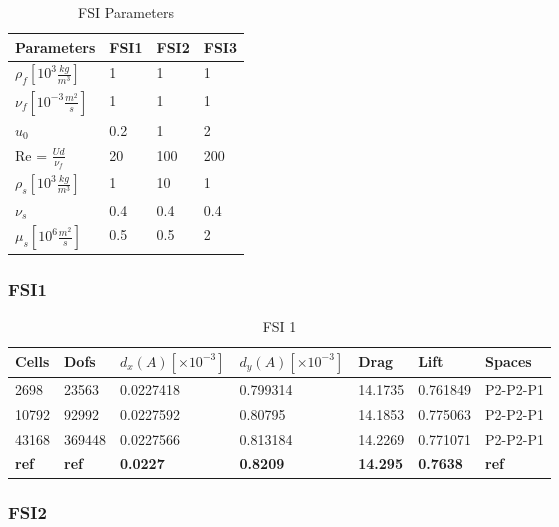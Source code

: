 \begin{table}[h!]
\centering
\caption{FSI Parameters}
\label{my-label}
\begin{tabular}{|l|l|l|l|}
\hline
Parameters & FSI1 & FSI2 & FSI3 \\ \hline
$\rho_f[10^3 \frac{kg}{m^3}]$ & 1 & 1 & 1 \\ \hline
$\nu_f [10^{-3} \frac{m^2}{s}]$ & 1 & 1 & 1 \\ \hline
$u_0$ & 0.2 & 1 & 2 \\ \hline
Re = $\frac{U d}{\nu_f}$ & 20 & 100 & 200 \\ \hline
$\rho_s[10^3 \frac{kg}{m^3}]$ & 1 & 10 & 1 \\ \hline
$\nu_s$ & 0.4 & 0.4 & 0.4 \\ \hline
$\mu_s[10^6 \frac{m^2}{s}]$ & 0.5 & 0.5 & 2 \\ \hline
\end{tabular}
\end{table}

\subsubsection*{FSI1}
\begin{table}[H]
\centering
\caption{FSI 1}
\label{my-label}
\begin{tabular}{|l|l|l|l|l|l|l|}
\hline
Cells & Dofs & $d_x(A) [\times10^{-3}]$ & $d_y(A)[\times10^{-3}]$ & Drag & Lift & Spaces \\ \hline
2698 & 23563 &0.0227418 &0.799314  &  14.1735 &0.761849 & P2-P2-P1 \\ \hline
10792 & 92992  &0.0227592 & 0.80795 & 14.1853 &  0.775063 &  P2-P2-P1 \\ \hline
43168 & 369448 & 0.0227566 & 0.813184 & 14.2269 & 0.771071 & P2-P2-P1 \\ \hline
\textbf{ref} & \textbf{ref} & \textbf{0.0227} & \textbf{0.8209} & \textbf{14.295} & \textbf{0.7638} & \textbf{ref} \\ \hline
\end{tabular}
\end{table}

\subsubsection*{FSI2}

